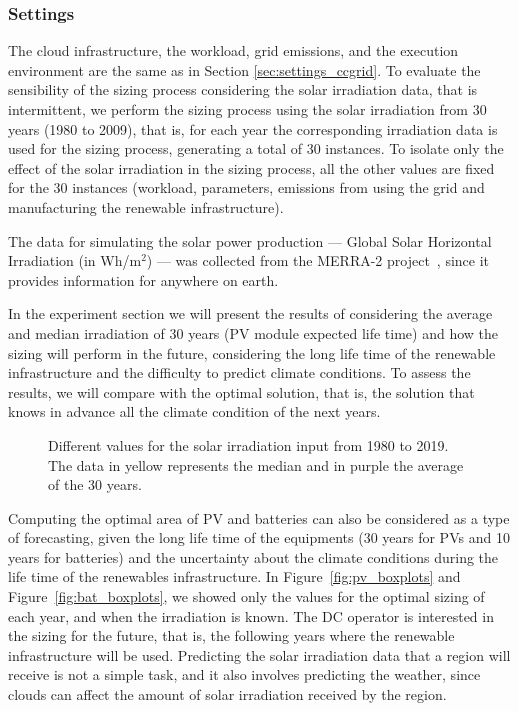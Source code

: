 \subsubsection{Settings}

The cloud infrastructure, the workload, grid emissions, and the execution environment are the same as in Section  \ref{sec:settings_ccgrid}. To evaluate the sensibility of the sizing process considering the solar irradiation data, that is intermittent, we perform the sizing process using the solar irradiation from 30 years (1980 to 2009), that is, for each year the corresponding irradiation data is used for the sizing process, generating a total of 30 instances. To isolate only the effect of the solar irradiation in the sizing process, all the other values are fixed for the 30 instances (workload, parameters,  emissions from using the grid and manufacturing the renewable infrastructure).


The data for simulating the solar power production --- Global Solar Horizontal Irradiation (in Wh/m$^{2}$) --- was collected from the MERRA-2 project~\cite{GELARO2017MERRA2}, since it provides information for anywhere on earth.



In the experiment section we will present the results of considering the average and median irradiation of 30 years (PV module expected life time) and how the sizing will perform in the future, considering the long life time of the renewable infrastructure and the difficulty to predict climate conditions. To assess the results, we will compare with the optimal solution, that is, the solution that knows in advance all the climate condition of the next years.

 \begin{figure}[!htbp]
  \centering
   {}
   \caption{Different values for the solar irradiation input from 1980 to 2019. The data in yellow represents the median and in purple the average of the 30 years. }
  \label{fig:pv_ghi}
\end{figure}




Computing the optimal area of PV and batteries can also be considered as a type of forecasting, given the long life time of the equipments (30 years for PVs and 10 years for batteries) and the uncertainty about the climate conditions during the life time of the renewables infrastructure. In Figure~\ref{fig:pv_boxplots} and Figure~\ref{fig:bat_boxplots}, we showed only the values for the optimal sizing of each year, and when the irradiation is known. The DC operator is interested in the sizing for the future, that is, the following years where the renewable infrastructure will be used. Predicting the solar irradiation data that a region will receive is not a simple task, and it also involves predicting the weather, since clouds can affect the amount of solar irradiation received by the region. 


